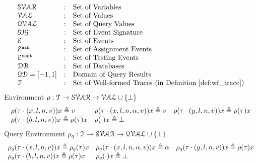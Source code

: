 \[
\begin{array}{lll}
\mathcal{SVAR} & : & \mbox{Set of Variables}  
\\ 
%
\mathcal{VAL} & : & \mbox{Set of Values} 
\\ 
%
\mathcal{QVAL} & : & \mbox{Set of Query Values} 
\\ 
%
\mathcal{SIG} & : & \mbox{Set of Event Signature} 
\\ 
%
\eventset  & : & \mbox{Set of Events}  
\\
%
%
\eventset^{\asn}  & : & \mbox{Set of Assignment Events}  
\\
%
\eventset^{\test}  & : & \mbox{Set of Testing Events}  
\\
%
\dbdom  & : & \mbox{{Set of Databases}} 
\\
%
\qdom = {[-1,1]} & : & \mbox{{Domain of Query Results}}
\\
%
\mathcal{T} & : & \mbox{Set of Well-formed Traces (in Definition~\ref{def:wf_trace})}
\end{array}
\]
%
%
%
Environment $ \rho : \mathcal{T}  \to \mathcal{SVAR} \to \mathcal{VAL} \cup \{\bot\}$
\[
\begin{array}{lll}
\rho(\mathtt{\tau}  \cdot (x, l, n, v)) x \triangleq v
&
\rho(\mathtt{\tau} \cdot (x, l, n, \alpha, v)) x \triangleq v
&
\rho(\mathtt{\tau} \cdot (y, l, n, v)) x \triangleq \rho(\mathtt{\tau}) x
\\
\rho(\mathtt{\tau} \cdot (b, l, n, v)) x \triangleq \rho(\mathtt{\tau}) x
&
\rho(\cdot ) x \triangleq \bot
&
\end{array}
\]
%
%
Query Environment $\rho_{q}: \mathcal{T}  \to \mathcal{SVAR} \to \mathcal{QVAL} \cup \{\bot\}$
\[
\begin{array}{lll}
\rho_{q}(\mathtt{\tau} \cdot (x, l, n, v) ) x \triangleq \rho_{q}(\mathtt{\tau}) x
&
\rho_{q}(\mathtt{\tau} \cdot (x, l, n, \alpha, v) ) x \triangleq \alpha
&
\rho_{q}(\mathtt{\tau} \cdot (y, l, n, v)) x \triangleq \rho(\mathtt{\tau}) x
\\
\rho_{q}(\mathtt{\tau} \cdot (b, l, n, v)) x \triangleq \rho(\mathtt{\tau}) x
&
\rho_{q}(\cdot ) x \triangleq \bot
&
\end{array}
\]
%

%
